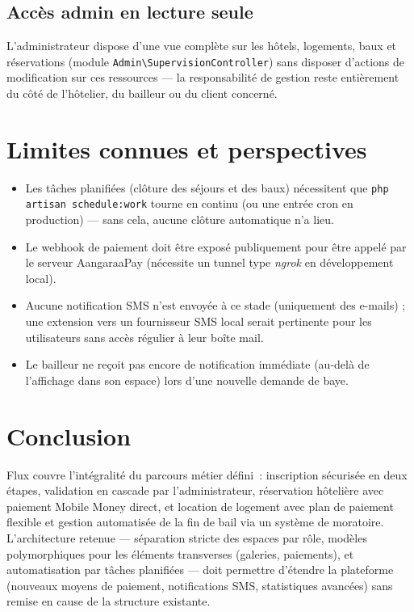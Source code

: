 \documentclass[11pt,a4paper]{report}
\newcommand{\tech}[1]{\texttt{\small #1}}
\begin{document}
\section{Accès admin en lecture seule}
L'administrateur dispose d'une vue complète sur les hôtels, logements, baux et réservations (module \tech{Admin\textbackslash SupervisionController}) sans disposer d'actions de modification sur ces ressources --- la responsabilité de gestion reste entièrement du côté de l'hôtelier, du bailleur ou du client concerné.

\chapter{Limites connues et perspectives}

\begin{itemize}[leftmargin=1.2cm]
    \item Les tâches planifiées (clôture des séjours et des baux) nécessitent que \tech{php artisan schedule:work} tourne en continu (ou une entrée cron en production) --- sans cela, aucune clôture automatique n'a lieu.
    \item Le webhook de paiement doit être exposé publiquement pour être appelé par le serveur AangaraaPay (nécessite un tunnel type \textit{ngrok} en développement local).
    \item Aucune notification SMS n'est envoyée à ce stade (uniquement des e-mails) ; une extension vers un fournisseur SMS local serait pertinente pour les utilisateurs sans accès régulier à leur boîte mail.
    \item Le bailleur ne reçoit pas encore de notification immédiate (au-delà de l'affichage dans son espace) lors d'une nouvelle demande de baye.
\end{itemize}

\chapter{Conclusion}

Flux couvre l'intégralité du parcours métier défini~: inscription sécurisée en deux étapes, validation en cascade par l'administrateur, réservation hôtelière avec paiement Mobile Money direct, et location de logement avec plan de paiement flexible et gestion automatisée de la fin de bail via un système de moratoire. L'architecture retenue --- séparation stricte des espaces par rôle, modèles polymorphiques pour les éléments transverses (galeries, paiements), et automatisation par tâches planifiées --- doit permettre d'étendre la plateforme (nouveaux moyens de paiement, notifications SMS, statistiques avancées) sans remise en cause de la structure existante.
\end{document}
